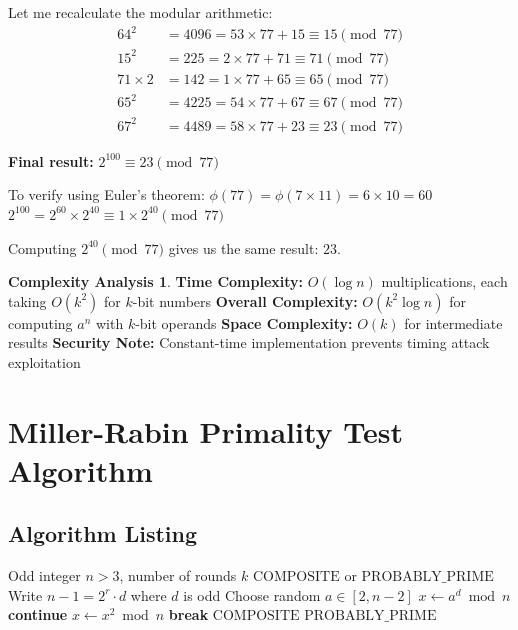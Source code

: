 \documentclass[12pt,a4paper]{article}
\theoremstyle{definition}
\newtheorem{complexity}{Complexity Analysis}[section]
\begin{document}
Let me recalculate the modular arithmetic:
\begin{align}
64^2 &= 4096 = 53 \times 77 + 15 \equiv 15 \pmod{77}\\
15^2 &= 225 = 2 \times 77 + 71 \equiv 71 \pmod{77}\\
71 \times 2 &= 142 = 1 \times 77 + 65 \equiv 65 \pmod{77}\\
65^2 &= 4225 = 54 \times 77 + 67 \equiv 67 \pmod{77}\\
67^2 &= 4489 = 58 \times 77 + 23 \equiv 23 \pmod{77}
\end{align}

\textbf{Final result:} $2^{100} \equiv 23 \pmod{77}$

To verify using Euler's theorem: $\phi(77) = \phi(7 \times 11) = 6 \times 10 = 60$
$2^{100} = 2^{60} \times 2^{40} \equiv 1 \times 2^{40} \pmod{77}$

Computing $2^{40} \pmod{77}$ gives us the same result: $23$.

\begin{complexity}
\textbf{Time Complexity:} $O(\log n)$ multiplications, each taking $O(k^2)$ for $k$-bit numbers
\textbf{Overall Complexity:} $O(k^2 \log n)$ for computing $a^n$ with $k$-bit operands
\textbf{Space Complexity:} $O(k)$ for intermediate results
\textbf{Security Note:} Constant-time implementation prevents timing attack exploitation
\end{complexity}

\section{Miller-Rabin Primality Test Algorithm}

\subsection{Algorithm Listing}

\begin{algorithm}[H]
\caption{Miller-Rabin Primality Test}
\label{alg:miller-rabin}
\begin{algorithmic}[1]
\REQUIRE Odd integer $n > 3$, number of rounds $k$
\ENSURE $\text{COMPOSITE}$ or $\text{PROBABLY\_PRIME}$
\STATE Write $n-1 = 2^r \cdot d$ where $d$ is odd
    \STATE Choose random $a \in [2, n-2]$
    \STATE $x \leftarrow a^d \bmod n$
        \STATE \textbf{continue} 
    \ENDIF
        \STATE $x \leftarrow x^2 \bmod n$
            \STATE \textbf{break} 
        \ENDIF
    \ENDFOR
        \RETURN $\text{COMPOSITE}$ 
    \ENDIF
\ENDFOR
\RETURN $\text{PROBABLY\_PRIME}$
\end{algorithmic}
\end{algorithm}
\end{document}
